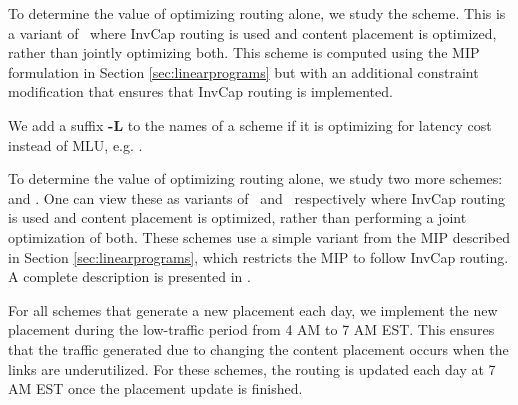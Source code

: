 To determine the value of optimizing routing alone, we study the \textbf{\invoptpfuture} scheme. This is a variant of \optrpfuture\ where InvCap routing is used and content placement is optimized, rather than jointly optimizing both. This scheme is computed  using the MIP formulation in Section \ref{sec:linearprograms} but with an additional constraint modification that ensures that InvCap routing is implemented.


We add a suffix  \textbf{-L} to the names of a scheme if it is optimizing for latency cost instead of MLU, e.g. \textbf{\optrpl}.




\eat
{
To determine the value of optimizing routing alone, we study two more schemes: \textbf{\invoptp}  and \textbf{\invoptpfuture}. One can view these as variants of \optrp\  and \optrpfuture\ respectively where InvCap routing is used and content placement is optimized, rather than performing a joint optimization of both. These schemes use a simple variant  from the MIP described in Section \ref{sec:linearprograms}, which restricts the MIP to follow InvCap routing. A complete description is presented in  \cite{techreport}.
}


For all schemes that generate a new placement each day, we implement the new placement during the low-traffic period from 4 AM to 7 AM EST. This ensures that the traffic generated due to changing the content placement occurs when the links are underutilized. For these schemes, the routing is updated each day at 7 AM EST once the placement update is finished. %


